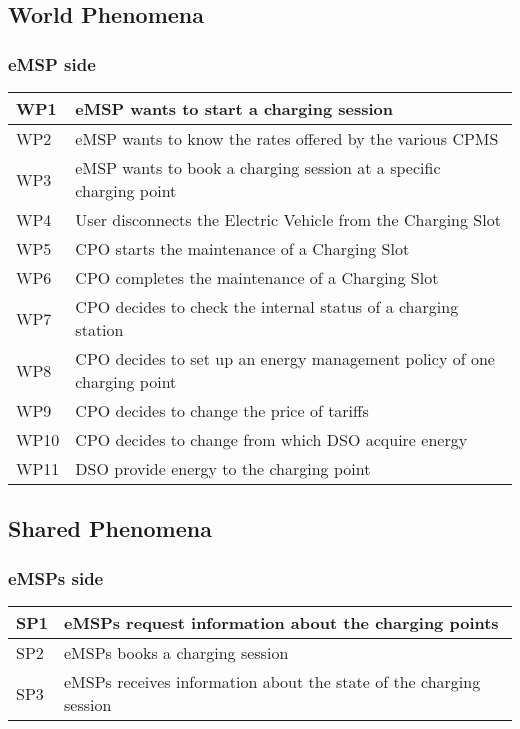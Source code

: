 \subsection{World Phenomena}

\subsubsection{eMSP side}
\begin{tabular}{|l|l|}
	\hline
	WP1 & eMSP wants to start a charging session\\
	\hline
	WP2 & eMSP wants to know the rates offered by the various CPMS\\
	\hline
	WP3 & eMSP wants to book a charging session at a specific charging point\\
	\hline
	WP4 & User disconnects the Electric Vehicle from the Charging Slot\\
	\hline
	WP5 & CPO starts the maintenance of a Charging Slot\\
	\hline
	WP6 & CPO completes the maintenance of a Charging Slot\\
	\hline
	WP7 & CPO decides to check the internal status of a charging station\\
	\hline
	WP8 & CPO decides to set up an energy management policy of one charging point\\
	\hline
	WP9 & CPO decides to change the price of tariffs\\
	\hline
	WP10 & CPO decides to change from which DSO acquire energy\\
	\hline
	WP11 & DSO provide energy to the charging point\\
	\hline
\end{tabular}


\subsection{Shared Phenomena}
\subsubsection{eMSPs side}
\begin{tabular}{|l|l|}
	\hline
	SP1 & eMSPs request information about the charging points\\
	\hline
	SP2 & eMSPs books a charging session \\
	\hline
	SP3 & eMSPs receives information about the state of the charging session\\
	\hline
\end{tabular}


